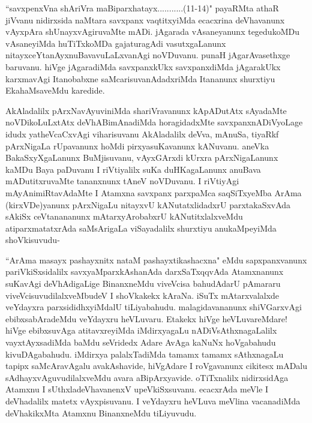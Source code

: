 
\begin{artha}
``savxpenxVna shAriVra maBiparxhatayx...........(11-14)" payaRMta athaR jiVvanu nidirxsida naMtara savxpanx vaqtitxyiMda ecacxrina deVhavanunx vAyxpAra shUnayxvAgiruvaMte mADi. jAgarada vAsaneyanunx tegedukoMDu vAsaneyiMda huTiTxkoMDa gajaturagAdi vasutxgaLanunx nitayxceYtanAyxnuBavavuLaLxvanAgi noVDuvanu. punaH jAgarAvasethxge baruvanu. hiVge jAgaradiMda savxpanxkUkx savxpanxdiMda jAgarakUkx karxmavAgi Itanobabxne saMcarisuvanAdadxriMda Itananunx shurxtiyu EkahaMsaveMdu karedide. 
\end{artha}

\begin{artha}
AkAladalilx pArxNavAyuviniMda shariVravanunx kApADutAtx sAyadaMte noVDikoLuLxtAtx deVhABimAnadiMda horagidadxMte savxpanxnADiVyoLage idudx yatheVcaCxvAgi viharisuvanu AkAladalilx deVva, mAnuSa, tiyaRkf pArxNigaLa rUpavanunx hoMdi pirxyasuKavanunx kANuvanu. aneVka BakaSxyXgaLanunx BuMjisuvanu, vAyxGArxdi kUrxra pArxNigaLanunx kaMDu Baya paDuvanu I riVtiyalilx suKa duHKagaLanunx anuBava mADutitxruvaMte tananxnunx tAneV noVDuvanu. I riVtiyAgi mAyAnimiRtavAdaMte I Atamxna savxpanx parxpaMca saqSiTxyeMba ArAma (kirxVDe)yanunx pArxNigaLu nitayxvU kANutatxlidadxrU parxtakaSxvAda sAkiSx ceVtanananunx mAtarxyArobabxrU kANutitxlalxveMdu atiparxmatatxrAda saMsArigaLa viSayadalilx shurxtiyu anukaMpeyiMda shoVkisuvudu-
\end{artha}

\begin{artha}%
``ArAma masayx pashayxnitx nataM pashayxtikashacxna" eMdu sapxpanxvanunx pariVkiSxsidalilx savxyaMparxkAshanAda darxSaTxqqvAda Atamxnanunx suKavAgi deVhAdigaLige BinanxneMdu viveVcisa bahudAdarU pAmararu viveVcisuvudilalxveMbudeV I shoVkakekx kAraNa. iSuTx mAtarxvalalxde veYdayxra parxsididhxyiMdalU tiLiyabahudu. malagidavananunx shiVGarxvAgi ebibxsabAradeMdu veYdayxru heVLuvaru. Etakekx hiVge heVLuvareMdare! hiVge ebibxsuvAga atitavxreyiMda iMdirxyagaLu nADiVsAthxnagaLalilx vayxtAyxsadiMda baMdu seVridedx Adare AvAga kaNuNx hoVgabahudu kivuDAgabahudu. iMdirxya palalxTadiMda tamamx tamamx sAthxnagaLu tapipx saMcAravAgalu avakAshavide, hiVgAdare I roVgavanunx cikitesx mADalu sAdhayxvAguvudilalxveMdu avara aBipArxyavide. oTiTxnalilx nidirxsidAga Atamxnu I sUthxladeVhavanenxV upeVkiSxsuvanu. ecacxrAda meVle I deVhadalilx matetx vAyxpisuvanu. I veYdayxru heVLuva meVlina vacanadiMda deVhakikxMta Atamxnu BinanxneMdu tiLiyuvudu.  
\end{artha}

